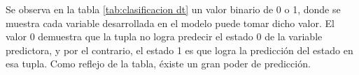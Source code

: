 \begin{table}[H]
\centering
\setlength{\tabcolsep}{10pt}
\caption{Predicciones probabilísticas con clasificación final Decision Tree}
\label{tab:clasificacion dt}
\end{table}
        
    Se observa en la tabla \ref{tab:clasificacion dt} un valor binario de 0 o 1, donde se muestra cada variable
desarrollada en el modelo puede tomar dicho valor. El valor 0 demuestra
que la tupla no logra predecir el estado 0 de la variable predictora, y
por el contrario, el estado 1 es que logra la predicción del estado en
esa tupla. Como reflejo de la tabla, éxiste un gran poder de predicción.

